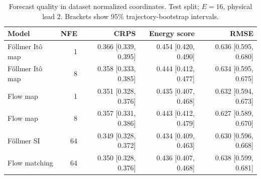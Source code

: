\begin{table}[t]
\centering
\small
\setlength{\tabcolsep}{3pt}
\caption{Forecast quality in dataset normalized coordinates. Test split; $E=16$, physical lead 2. Brackets show 95\% trajectory-bootstrap intervals.}
\label{tab:map-quality}
\begin{tabular}{lrrrr}
\toprule
Model & NFE & CRPS & Energy score & RMSE \\
\midrule
Föllmer Itô map & 1 & 0.366 [0.339, 0.395] & 0.454 [0.420, 0.490] & 0.636 [0.595, 0.680] \\
Föllmer Itô map & 8 & 0.358 [0.333, 0.385] & 0.444 [0.412, 0.477] & 0.634 [0.595, 0.675] \\
\addlinespace
Flow map & 1 & 0.351 [0.328, 0.376] & 0.435 [0.407, 0.468] & 0.632 [0.594, 0.673] \\
Flow map & 8 & 0.357 [0.331, 0.386] & 0.443 [0.412, 0.479] & 0.627 [0.589, 0.670] \\
\addlinespace
Föllmer SI & 64 & 0.349 [0.328, 0.372] & 0.434 [0.409, 0.463] & 0.630 [0.596, 0.668] \\
\addlinespace
Flow matching & 64 & 0.350 [0.328, 0.376] & 0.436 [0.407, 0.468] & 0.638 [0.599, 0.681] \\
\bottomrule
\end{tabular}
\end{table}
